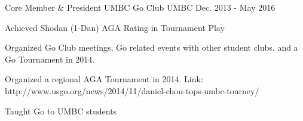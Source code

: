 

\begin{cventries}

  \cventry
    {Core Member \& President} %
    {UMBC Go Club} %
    {UMBC} %
    {Dec. 2013 - May 2016} %
    {
      \begin{cvitems} %
        \item {Achieved Shodan (1-Dan) AGA Rating in Tournament Play}
		\item {Organized Go Club meetings, Go related events with other student clubs. and a Go Tournament in 2014.}
        \item {Organized a regional AGA Tournament in 2014. Link: http://www.usgo.org/news/2014/11/daniel-chou-tops-umbc-tourney/}
		\item {Taught Go to UMBC students}
      \end{cvitems}
    }

\end{cventries}
